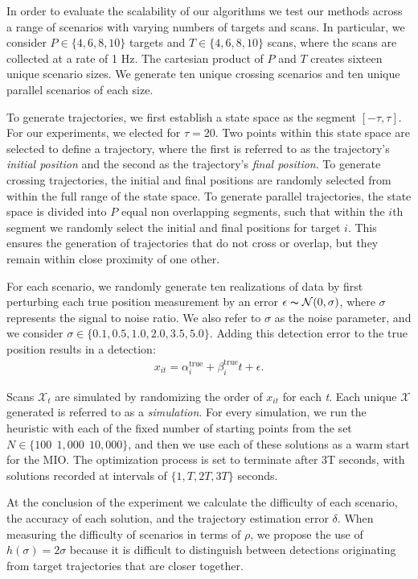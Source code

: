 In order to evaluate the scalability of our algorithms we test our methods across a range of scenarios with varying numbers of targets and scans. In particular, we consider $ P \in \{4,6,8,10\}$ targets and $T \in \{4,6,8,10\}$ scans, where the scans are collected at a rate of 1 Hz. The cartesian product of $P$ and $T$ creates sixteen unique scenario sizes. We generate ten unique crossing scenarios and ten unique parallel scenarios of each size. 

To generate trajectories, we first establish a state space as the segment $[-\tau,\tau]$. For our experiments, we elected for $\tau = 20$. Two points within this state space are selected to define a trajectory, where the first is referred to as the trajectory's \textit{initial position} and the second as the trajectory's \textit{final position}. To generate crossing trajectories, the initial and final positions are randomly selected from within the full range of the state space. To generate parallel trajectories, the state space is divided into $P$ equal non overlapping segments, such that within the $i$th segment we randomly select the initial and final positions for target $i$. This ensures the generation of trajectories that do not cross or overlap, but they remain within close proximity of one other. 

For each scenario, we randomly generate ten realizations of data by first perturbing each true position measurement by an error $\epsilon \thicksim \mathcal{N}(0,\sigma)$, where $\sigma$ represents the signal to noise ratio. We also refer to $\sigma$ as the noise parameter, and we consider $\sigma \in\{0.1,0.5,1.0,2.0,3.5,5.0\}$. Adding this detection error to the true position results in a detection:
\begin{align*}
	x_{it} = \alpha^{\text{true}}_{i} + \beta^{\text{true}}_{i}t+\epsilon.
\end{align*}

Scans $\mathcal{X}_{t}$ are simulated by randomizing the order of $x_{it}$ for each \textit{t}. Each unique $\boldsymbol{\mathcal{X}}$ generated is referred to as a \textit{simulation}. For every simulation, we run the heuristic with each of the fixed number of starting points from the set $N \in \{100\ \ 1,000\ \ 10,000\}$, and then we use each of these solutions as a warm start for the MIO. The optimization process is set to terminate after 3T seconds, with solutions recorded at intervals of $\{1,T,2T,3T\}$ seconds.

At the conclusion of the experiment we calculate the difficulty of each scenario, the accuracy of each solution, and the trajectory estimation error $\delta$. When measuring the difficulty of scenarios in terms of $\rho$, we propose the use of $h(\sigma)=2\sigma$ because it is difficult to distinguish between detections originating from target trajectories that are closer together.


